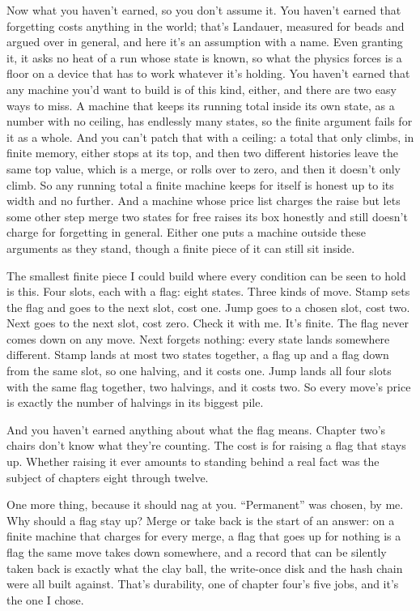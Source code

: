 \documentclass[11pt,twoside]{article}
\theoremstyle{thielethm}
\theoremstyle{thieledef}
\theoremstyle{thieledef}
\theoremstyle{thieledef}
\theoremstyle{thielethm}
\theoremstyle{thieleobs}
\theoremstyle{thielethm}
\begin{document}
Now what you haven't earned, so you don't assume it. You haven't earned that forgetting costs anything in the world; that's Landauer, measured for beads and argued over in general, and here it's an assumption with a name. Even granting it, it asks no heat of a run whose state is known, so what the physics forces is a floor on a device that has to work whatever it's holding. You haven't earned that any machine you'd want to build is of this kind, either, and there are two easy ways to miss. A machine that keeps its running total inside its own state, as a number with no ceiling, has endlessly many states, so the finite argument fails for it as a whole. And you can't patch that with a ceiling: a total that only climbs, in finite memory, either stops at its top, and then two different histories leave the same top value, which is a merge, or rolls over to zero, and then it doesn't only climb. So any running total a finite machine keeps for itself is honest up to its width and no further. And a machine whose price list charges the raise but lets some other step merge two states for free raises its box honestly and still doesn't charge for forgetting in general. Either one puts a machine outside these arguments as they stand, though a finite piece of it can still sit inside.

The smallest finite piece I could build where every condition can be seen to hold is this. Four slots, each with a flag: eight states. Three kinds of move. Stamp sets the flag and goes to the next slot, cost one. Jump goes to a chosen slot, cost two. Next goes to the next slot, cost zero. Check it with me. It's finite. The flag never comes down on any move. Next forgets nothing: every state lands somewhere different. Stamp lands at most two states together, a flag up and a flag down from the same slot, so one halving, and it costs one. Jump lands all four slots with the same flag together, two halvings, and it costs two. So every move's price is exactly the number of halvings in its biggest pile.

And you haven't earned anything about what the flag means. Chapter two's chairs don't know what they're counting. The cost is for raising a flag that stays up. Whether raising it ever amounts to standing behind a real fact was the subject of chapters eight through twelve.

One more thing, because it should nag at you. ``Permanent'' was chosen, by me. Why should a flag stay up? Merge or take back is the start of an answer: on a finite machine that charges for every merge, a flag that goes up for nothing is a flag the same move takes down somewhere, and a record that can be silently taken back is exactly what the clay ball, the write-once disk and the hash chain were all built against. That's durability, one of chapter four's five jobs, and it's the one I chose.
\end{document}
